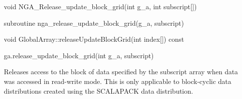 \documentclass[10pt]{article}
\begin{document}


\begin{capi}
\begin{ccode}
void NGA_Release_update_block_grid(int g_a, int subscript[])
\end{ccode}
\begin{funcargs}
\end{funcargs}
\end{capi}

\begin{fapi}
\begin{fcode}
subroutine nga_release_update_block_grid(g_a, subscript)
\end{fcode}
\begin{funcargs}
\end{funcargs}
\end{fapi}

\begin{cxxapi}
\begin{cxxcode}
void GlobalArray::releaseUpdateBlockGrid(int index[]) const
\end{cxxcode}
\begin{funcargs}
\end{funcargs}
\end{cxxapi}

\begin{pyapi}
\begin{pycode}
ga.release_update_block_grid(int g_a, subscript)
\end{pycode}
\begin{funcargs}
\end{funcargs}
\end{pyapi}

\local

\begin{desc}

Releases access to the block of data specified by the subscript array when data
was accessed in read-write mode. This is only applicable to block-cyclic data
distributions created using the SCALAPACK data distribution.

\end{desc}
\end{document}
